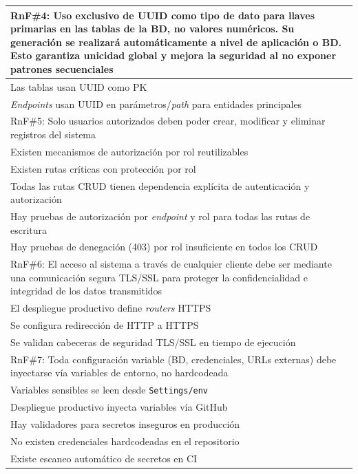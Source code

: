 \begin{addendum}
\begin{longtable}{|p{10cm}|p{3cm}|}
		\hline
		\multicolumn{2}{|p{13cm}|}{\ac{RnF}\#4: Uso exclusivo de \ac{UUID} como tipo de dato para llaves primarias en las tablas de la \ac{BD}, no valores numéricos.
			Su generación se realizará automáticamente a nivel de aplicación o \ac{BD}. Esto garantiza unicidad global y mejora la seguridad al no exponer 
			patrones secuenciales} \\
		\hline
		Las tablas usan \ac{UUID} como \ac{PK} & \checkmark \\
		\hline
		\textit{Endpoints} usan \ac{UUID} en parámetros/\textit{path} para entidades principales & \checkmark \\
		\hline
		\multicolumn{2}{|p{13cm}|}{\ac{RnF}\#5: Solo usuarios autorizados deben poder crear, modificar y eliminar registros del sistema} \\
		\hline
		Existen mecanismos de autorización por rol reutilizables & \checkmark \\
		\hline
		Existen rutas críticas con protección por rol & \checkmark \\
		\hline
		Todas las rutas \ac{CRUD} tienen dependencia explícita de autenticación y autorización & \checkmark \\
		\hline
		Hay pruebas de autorización por \textit{endpoint} y rol para todas las rutas de escritura & \checkmark \\
		\hline
		Hay pruebas de denegación (403) por rol insuficiente en todos los \ac{CRUD} & \checkmark \\
		\hline
		\multicolumn{2}{|p{13cm}|}{\ac{RnF}\#6: El acceso al sistema a través de cualquier cliente debe ser mediante una
			comunicación segura \ac{TLS}/\ac{SSL} para proteger la 
			confidencialidad e integridad de los datos transmitidos} \\
		\hline
		El despliegue productivo define \textit{routers} \ac{HTTPS} & \checkmark \\
		\hline
		Se configura redirección de \ac{HTTP} a \ac{HTTPS} & \checkmark \\
		\hline
		Se validan cabeceras de seguridad \ac{TLS}/\ac{SSL} en tiempo de ejecución & \checkmark \\
		\hline
		\multicolumn{2}{|p{13cm}|}{\ac{RnF}\#7: Toda configuración variable (\ac{BD}, credenciales, \ac{URL}s externas) debe inyectarse vía variables de entorno, no hardcodeada} \\
		\hline
		Variables sensibles se leen desde \texttt{Settings/env} & \checkmark \\
		\hline
		Despliegue productivo inyecta variables vía GitHub & \checkmark \\
		\hline
		Hay validadores para secretos inseguros en producción & \checkmark \\
		\hline
		No existen credenciales hardcodeadas en el repositorio & \checkmark \\
		\hline
		Existe escaneo automático de secretos en \ac{CI} & \checkmark \\
		\hline
		

\end{longtable}
\end{addendum}
